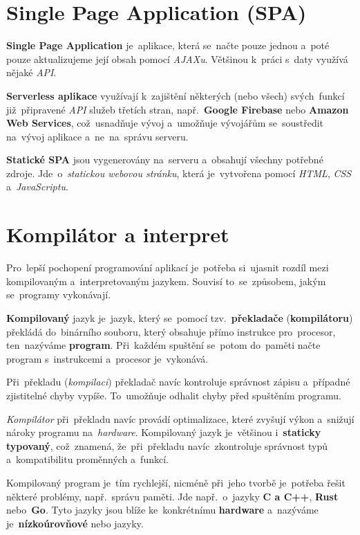\documentclass[11pt,a4paper]{report}
\begin{document}
        \section{Single Page Application (SPA)}
            \textbf{Single Page Application} je~aplikace, která se~načte pouze jednou a~poté pouze aktualizujeme její obsah pomocí \emph{AJAXu}. Většinou k~práci s~daty využívá nějaké \emph{API}.

            \textbf{Serverless aplikace} využívají k~zajištění některých (nebo všech) svých~funkcí již~připravené \emph{API} služeb třetích stran, např.~\textbf{Google Firebase} nebo \textbf{Amazon Web Services}, což~usnadňuje vývoj a~umožňuje vývojářům se~soustředit na~vývoj aplikace a~ne~na~správu serveru.
            
            \textbf{Statické SPA} jsou vygenerovány na~serveru a~obsahují všechny potřebné zdroje. Jde~o~\emph{statickou webovou stránku}, která je~vytvořena pomocí \emph{HTML}, \emph{CSS} a~\emph{JavaScriptu}.
        
        \section{Kompilátor a interpret}
            Pro~lepší pochopení programování aplikací je~potřeba si~ujasnit rozdíl mezi kompilovaným a~interpretovaným jazykem. Souvisí to~se~způsobem, jakým se~programy vykonávají.

            \textbf{Kompilovaný} jazyk je~jazyk, který se~pomocí tzv.~\textbf{překladače} (\textbf{kompilátoru}) překládá do~binárního souboru, který obsahuje přímo instrukce pro~procesor, ten~nazýváme \textbf{program}. Při~každém spuštění se~potom do~paměti načte program s~instrukcemi a~procesor je~vykonává.
            
            Při~překladu (\emph{kompilaci}) překladač navíc kontroluje správnost zápisu a~případné zjistitelné chyby vypíše. To~umožňuje odhalit chyby před spuštěním programu.
            
            \emph{Kompilátor} při~překladu navíc provádí optimalizace, které zvyšují výkon a~snižují nároky programu na~\emph{hardware}. Kompilovaný jazyk je~většinou i~\textbf{staticky typovaný}, což~znamená, že~při~překladu navíc~zkontroluje správnost typů a~kompatibilitu proměnných a~funkcí.
            
            Kompilovaný program je~tím rychlejší, nicméně při~jeho tvorbě je~potřeba řešit některé problémy, např.~správu paměti. Jde např.~o~jazyky \textbf{C a C++}, \textbf{Rust} nebo~\textbf{Go}. Tyto jazyky jsou blíže ke~konkrétnímu \textbf{hardware} a~nazýváme je~\textbf{nízkoúrovňové} nebo jazyky.
            
\end{document}
